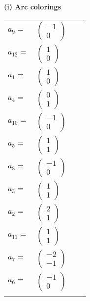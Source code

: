 \documentclass[1p]{elsarticle_modified}
\theoremstyle{definition}
\begin{document}
\flushleft \textbf{(i) Arc colorings}\\
\begin{tabular}{m{7pt} m{180pt} m{7pt} m{180pt} }
\flushright $a_{9}=$&$\begin{pmatrix}-1\\0\end{pmatrix}$ \\
\flushright $a_{12}=$&$\begin{pmatrix}1\\0\end{pmatrix}$ \\
\flushright $a_{1}=$&$\begin{pmatrix}1\\0\end{pmatrix}$ \\
\flushright $a_{4}=$&$\begin{pmatrix}0\\1\end{pmatrix}$ \\
\flushright $a_{10}=$&$\begin{pmatrix}-1\\0\end{pmatrix}$ \\
\flushright $a_{5}=$&$\begin{pmatrix}1\\1\end{pmatrix}$ \\
\flushright $a_{8}=$&$\begin{pmatrix}-1\\0\end{pmatrix}$ \\
\flushright $a_{3}=$&$\begin{pmatrix}1\\1\end{pmatrix}$ \\
\flushright $a_{2}=$&$\begin{pmatrix}2\\1\end{pmatrix}$ \\
\flushright $a_{11}=$&$\begin{pmatrix}1\\1\end{pmatrix}$ \\
\flushright $a_{7}=$&$\begin{pmatrix}-2\\-1\end{pmatrix}$ \\
\flushright $a_{6}=$&$\begin{pmatrix}-1\\0\end{pmatrix}$\\&\end{tabular}
\end{document}
